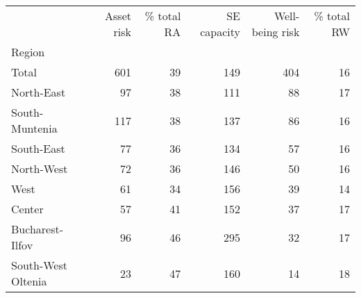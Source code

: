 \begin{tabular}{lrrrrr}
\toprule
{} &  Asset risk &  \% total RA &  SE capacity &  Well-being risk &  \% total RW \\
Region             &             &             &              &                  &             \\
\midrule
Total              &         601 &          39 &          149 &              404 &          16 \\
North-East         &          97 &          38 &          111 &               88 &          17 \\
South-Muntenia     &         117 &          38 &          137 &               86 &          16 \\
South-East         &          77 &          36 &          134 &               57 &          16 \\
North-West         &          72 &          36 &          146 &               50 &          16 \\
West               &          61 &          34 &          156 &               39 &          14 \\
Center             &          57 &          41 &          152 &               37 &          17 \\
Bucharest-Ilfov    &          96 &          46 &          295 &               32 &          17 \\
South-West Oltenia &          23 &          47 &          160 &               14 &          18 \\
\bottomrule
\end{tabular}

